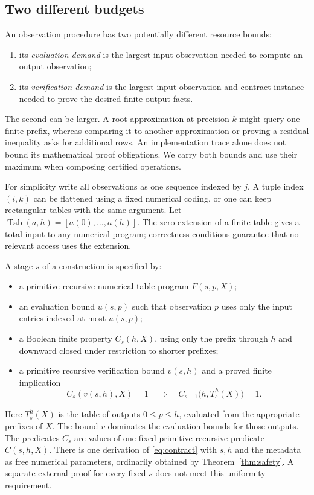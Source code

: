 \subsection{Two different budgets}

An observation procedure has two potentially different resource bounds:
\begin{enumerate}
\item its \emph{evaluation demand} is the largest input observation needed
      to compute an output observation;
\item its \emph{verification demand} is the largest input observation and
      contract instance needed to prove the desired finite output facts.
\end{enumerate}
The second can be larger. A root approximation at precision $k$ might
query one finite prefix, whereas comparing it to another approximation or
proving a residual inequality asks for additional rows. An implementation
trace alone does not bound its mathematical proof obligations. We carry
both bounds and use their maximum when composing certified operations.

For simplicity write all observations as one sequence indexed by $j$.
A tuple index $(i,k)$ can be flattened using a fixed numerical coding, or
one can keep rectangular tables with the same argument. Let
$\operatorname{Tab}(a,h)=[a(0),\ldots,a(h)]$. The zero extension of a
finite table gives a total input to any numerical program; correctness
conditions guarantee that no relevant access uses the extension.

\begin{definition}
\label{def:contract}
A stage $s$ of a construction is specified by:
\begin{itemize}
\item a primitive recursive numerical table program $F(s,p,X)$;
\item an evaluation bound $u(s,p)$ such that observation $p$ uses only the
      input entries indexed at most $u(s,p)$;
\item a Boolean finite property $C_s(h,X)$, using only the prefix through
      $h$ and downward closed under restriction to shorter prefixes;
\item a primitive recursive verification bound $v(s,h)$ and a proved
      finite implication
\begin{equation}
 C_s(v(s,h),X)=1
 \quad\Longrightarrow\quad
 C_{s+1}\bigl(h,T_s^h(X)\bigr)=1.             \label{eq:contract}
\end{equation}
\end{itemize}
Here $T_s^h(X)$ is the table of outputs $0\le p\le h$, evaluated from the
appropriate prefixes of $X$. The bound $v$ dominates the evaluation
bounds for those outputs. The predicates $C_s$ are values of one fixed
primitive recursive predicate $C(s,h,X)$. There is one \iPRA{}
derivation of \eqref{eq:contract} with $s,h$ and the metadata as free
numerical parameters, ordinarily obtained by Theorem~\ref{thm:safety}.
A separate external proof for every fixed $s$ does not meet this
uniformity requirement.
\end{definition}

